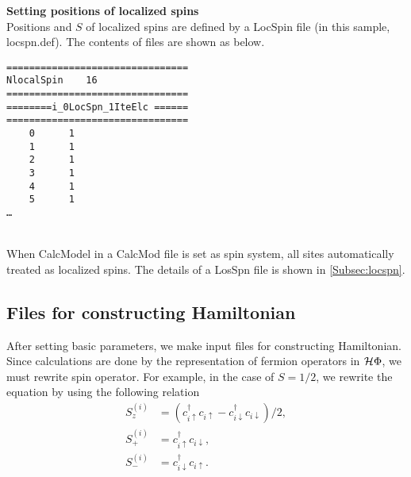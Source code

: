 \begin{description}
\item {\bf Setting positions of localized spins}\\
Positions {and $S$} of localized spins are defined by a LocSpin file (in this sample, locspn.def). The contents of files are shown as below.\\
\begin{minipage}{15cm}
\begin{screen}
\begin{verbatim}
================================ 
NlocalSpin    16  
================================ 
========i_0LocSpn_1IteElc ====== 
================================ 
    0      1
    1      1
    2      1
    3      1
    4      1
    5      1
…
\end{verbatim}
\end{screen}
\end{minipage}
~\\
When CalcModel in a CalcMod file is set as spin system, all sites automatically treated as localized spins. The details of a LosSpn file is shown in \ref{Subsec:locspn}.
\end{description}

\subsection{Files for constructing Hamiltonian}
After setting basic parameters, we make input files for constructing Hamiltonian. Since calculations are done by the representation of fermion operators in $\mathcal{H} \Phi$, we must rewrite spin operator. {For example,  in the case of $S=1/2$, we rewrite the equation by} using the following relation
\begin{align}
S_z^{(i)}&=(c_{i\uparrow}^{\dag}c_{i\uparrow}-c_{i\downarrow}^{\dag}c_{i\downarrow})/2,\\
S_+^{(i)}&=c_{i\uparrow}^{\dag}c_{i\downarrow},\\
S_-^{(i)}&=c_{i\downarrow}^{\dag}c_{i\uparrow}.
\end{align}


